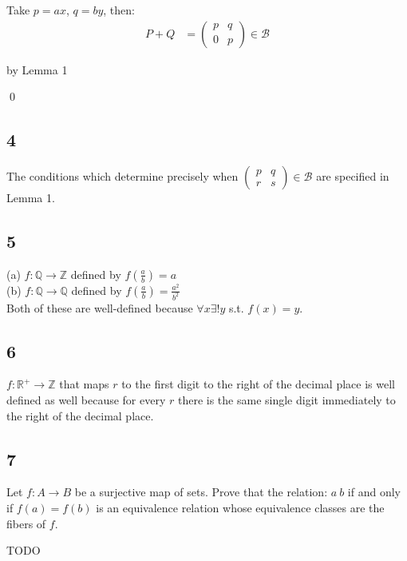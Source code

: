 \documentclass[12pt]{article}
\begin{document}
Take $p = a x$, $q = b y$, then: \\

\begin{align*}
P + Q &= \begin{pmatrix}
p & q \\
0 & p
\end{pmatrix} \in \mathcal{B}
\end{align*}

by Lemma 1

\qed

\subsection*{4}

The conditions which determine precisely when $\begin{pmatrix}
p & q \\
r & s
\end{pmatrix} \in \mathcal{B}$ are specified in Lemma 1.

\subsection*{5}

(a) $f : \mathbb{Q} \rightarrow \mathbb{Z}$ defined by $f(\frac{a}{b}) = a$ \\
(b) $f : \mathbb{Q} \rightarrow \mathbb{Q}$ defined by $f(\frac{a}{b}) = \frac{a^2}{b^2}$ \\

Both of these are well-defined because $\forall x \exists! y$ s.t. $f(x) = y$.

\subsection*{6}

$f : \mathbb{R}^{+} \rightarrow \mathbb{Z}$ that maps $r$ to the first digit to the right of the decimal place is well defined as well because for every $r$ there is the same single digit immediately to the right of the decimal place.

\subsection*{7}

Let $f : A \rightarrow B$ be a surjective map of sets. Prove that the relation: $a ~ b$ if and only if $f(a) = f(b)$ is an equivalence relation whose equivalence classes are the fibers of $f$.

TODO
\end{document}
